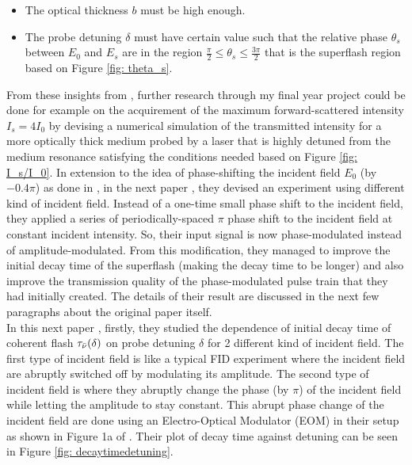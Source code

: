 \begin{itemize}
    \item The optical thickness $b$ must be high enough.
    \item The probe detuning $\delta$ must have certain value such that the relative phase $\theta_{s}$ between $E_{0}$ and $E_{s}$ are in the region $\frac{\pi}{2} \leq \theta_{s} \leq \frac{3\pi}{2}$ that is the superflash region based on Figure \ref{fig: theta_s}.
\end{itemize}

From these insights from \cite{Kwong2014}, further research through my final year project could be done for example on the acquirement of the maximum forward-scattered intensity $I_{s} = 4 I_{0}$ by devising a numerical simulation of the transmitted intensity for a more optically thick medium probed by a laser that is highly detuned from the medium resonance satisfying the conditions needed based on Figure \ref{fig: I_s/I_0}. In extension to the idea of phase-shifting the incident field $E_{0}$ (by $-0.4\pi$) as done in \cite{Kwong2014}, in the next paper \cite{Kwong2015}, they devised an experiment using different kind of incident field. Instead of a one-time small phase shift to the incident field, they applied a series of periodically-spaced $\pi$ phase shift to the incident field at constant incident intensity. So, their input signal is now phase-modulated instead of amplitude-modulated. From this modification, they managed to improve the initial decay time of the superflash (making the decay time to be longer) and also improve the transmission quality of the phase-modulated pulse train that they had initially created. The details of their result are discussed in the next few paragraphs about the original paper \cite{Kwong2015} itself.\\

In this next paper \cite{Kwong2015}, firstly, they studied the dependence of initial decay time of coherent flash $\tau_{\Bar{\nu}}(\delta)$ on probe detuning $\delta$ for 2 different kind of incident field. The first type of incident field is like a typical FID experiment where the incident field are abruptly switched off by modulating its amplitude. The second type of incident field is where they abruptly change the phase (by $\pi$) of the incident field  while letting the amplitude to stay constant. This abrupt phase change of the incident field are done using an Electro-Optical Modulator (EOM) in their setup as shown in Figure 1a of \cite{Kwong2015}. Their plot of decay time against detuning can be seen in Figure \ref{fig: decaytimedetuning}.

